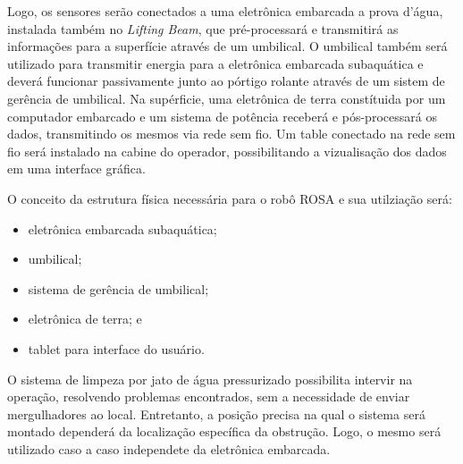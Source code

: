 Logo, os sensores serão conectados a uma eletrônica embarcada a prova d'água,
instalada também no \emph{Lifting Beam}, que pré-processará e transmitirá as
informações para a superfície através de um umbilical. 
O umbilical também será utilizado para transmitir energia para a eletrônica embarcada subaquática e deverá funcionar passivamente junto ao pórtigo rolante através de um sistem de gerência de umbilical. 
Na supérficie, uma eletrônica de terra constítuida por um computador embarcado e um sistema de potência receberá e pós-processará os dados, transmitindo os mesmos via rede sem fio. 
Um table conectado na rede sem fio será instalado na cabine do operador, possibilitando a vizualisação dos dados em uma interface gráfica.

O conceito da estrutura física necessária para o robô ROSA e sua utilziação será: 

\begin{itemize}

	\item eletrônica embarcada subaquática; 
	\item umbilical;
	\item sistema de gerência de umbilical;
	\item eletrônica de terra; e
	\item tablet para interface do usuário. 

\end{itemize}

O sistema de limpeza por jato de água pressurizado possibilita intervir na
operação, resolvendo problemas encontrados, sem a necessidade de enviar
mergulhadores ao local. Entretanto, a posição precisa na qual o sistema será
montado dependerá da localização específica da obstrução. Logo, o mesmo será utilizado caso a caso independete da eletrônica embarcada.



